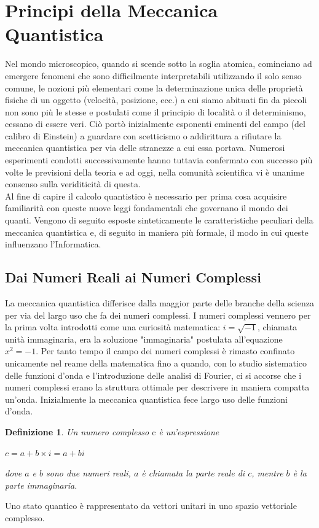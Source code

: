 \documentclass[12pt,a4paper,openright]{report}
\newtheorem{mydef}{Definizione}[chapter]
\begin{document}
\section{Principi della Meccanica Quantistica}
Nel mondo microscopico, quando si scende sotto la soglia atomica, cominciano ad emergere fenomeni che sono difficilmente interpretabili utilizzando il solo senso comune,
le nozioni più elementari come la determinazione unica delle proprietà fisiche di un oggetto (velocità, posizione, ecc.) a cui siamo abituati fin da piccoli non sono più le stesse e
postulati come il principio di località o il determinismo, cessano di essere veri.
Ciò portò inizialmente esponenti eminenti del campo (del calibro di Einstein) a guardare con scetticismo o addirittura a rifiutare la meccanica quantistica per via delle stranezze a cui essa portava.
Numerosi esperimenti condotti successivamente hanno tuttavia confermato con successo più volte le previsioni della teoria e ad oggi, nella comunità scientifica vi è unanime consenso sulla veriditicità di questa.\\
Al fine di capire il calcolo quantistico è necessario per prima cosa acquisire familiarità con queste nuove leggi fondamentali che governano il mondo dei quanti.
Vengono di seguito esposte sinteticamente le caratteristiche peculiari della meccanica quantistica e, di seguito in maniera più formale, il modo in cui queste influenzano l'Informatica.

\subsection{Dai Numeri Reali ai Numeri Complessi}
La meccanica quantistica differisce dalla maggior parte delle branche della scienza per via del largo uso che fa dei numeri complessi.
I numeri complessi vennero per la prima volta introdotti come una curiosità matematica: $i=\sqrt{-1}$, chiamata unità immaginaria, era la soluzione "immaginaria" postulata
all'equazione $x^2=-1$. Per tanto tempo il campo dei numeri complessi è rimasto confinato unicamente nel reame della matematica fino a quando,
con lo studio sistematico delle funzioni d'onda e l'introduzione delle analisi di Fourier, ci si accorse che i numeri complessi erano la struttura
ottimale per descrivere in maniera compatta un'onda. Inizialmente la meccanica quantistica fece largo uso delle funzioni d'onda.\par
\begin{mydef}
    Un numero complesso $\text{c}$ è un'espressione
    \begin{center}
        $c = a + b \times i = a + bi$\\
    \end{center}
        dove $a$ e $b$ sono due numeri reali, $a$ è chiamata la parte reale di $c$, mentre $b$ è la parte immaginaria.
    
\end{mydef}
Uno stato quantico è rappresentato da vettori unitari in uno spazio vettoriale complesso.
\end{document}
